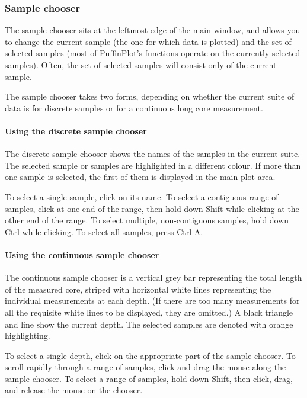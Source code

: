 \documentclass[a4paper,british]{article}
\newcommand{\ppcmd}[1]{\textsf{#1}} %
\begin{document}
\subsubsection{Sample chooser}

The sample chooser sits at the leftmost edge of the main window, and
allows you to change the current sample (the one for which data is
plotted) and the set of selected samples (most of PuffinPlot's functions
operate on the currently selected samples). Often, the set of selected
samples will consist only of the current sample.

The sample chooser takes two forms, depending on whether the current
suite of data is for discrete samples or for a continuous long core
measurement.

\paragraph{Using the discrete sample chooser}

The discrete sample chooser shows the names of the samples in the current
suite. The selected sample or samples are highlighted in a different colour.
If more than one sample is selected, the first of them is displayed in the
main plot area.

To select a single sample, click on its name. To select a contiguous range of
samples, click at one end of the range, then hold down \ppcmd{Shift} while
clicking at the other end of the range. To select multiple, non-contiguous
samples, hold down \ppcmd{Ctrl} while clicking. To select all samples, press
\ppcmd{Ctrl-A}.

\paragraph{Using the continuous sample chooser}

The continuous sample chooser is a vertical grey bar representing the total
length of the measured core, striped with horizontal white lines representing
the individual measurements at each depth. (If there are too many
measurements for all the requisite white lines to be displayed, they are
omitted.) A black triangle and line show the current depth. The selected
samples are denoted with orange highlighting.

To select a single depth, click on the appropriate part of the sample
chooser. To scroll rapidly through a range of samples, click and drag the
mouse along the sample chooser. To select a range of samples, hold down
\ppcmd{Shift}, then click, drag, and release the mouse on the chooser.
\end{document}
